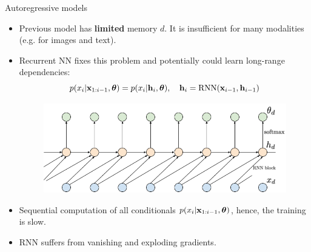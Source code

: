 \begin{frame}{Autoregressive models}
	\begin{itemize}
		\item Previous model has \textbf{limited} memory $d$. It is insufficient for many modalities (e.g. for images and text). 
		\item Recurrent NN fixes this problem and potentially could learn long-range dependencies:
		\[
			p(x_i | \mathbf{x}_{1:i - 1}, \boldsymbol{\theta}) = p(x_i | \mathbf{h}_i, \boldsymbol{\theta}), \quad \mathbf{h}_i = \text{RNN}(\mathbf{x}_{i - 1}, \mathbf{h}_{i - 1})
		\]
		 \begin{figure}
	    \centering
	    \includegraphics[width=0.7\linewidth]{figs/sequential_RNN}
		 \end{figure}
		\item Sequential computation of all conditionals $p(x_i | \mathbf{x}_{1:i-1}, \boldsymbol{\theta})$, hence, the training is slow.
		\item RNN suffers from vanishing and exploding gradients.
	\end{itemize}
\end{frame}
